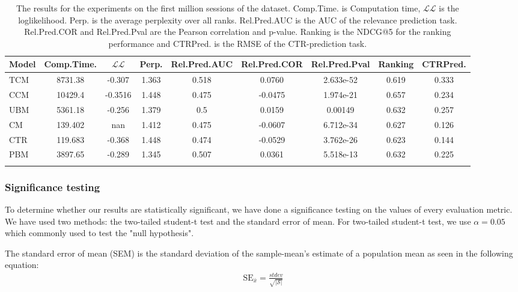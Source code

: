\begin{table}
	\centering
	\begin{tabular}{lcccccccc}
		\toprule
		Model	&	Comp.Time.	&	$\mathcal{LL}$	&	Perp.	&	Rel.Pred.AUC	&	Rel.Pred.COR	&	Rel.Pred.Pval	&	Ranking	&	CTRPred. \\ \midrule
		TCM	&	8731.38	&	-0.307	&	1.363	&	0.518	&	0.0760	&	2.633e-52	&	0.619	&	0.333 \\
		CCM	&	10429.4	&	-0.3516	&	1.448	&	0.475	&	-0.0475	&	1.974e-21	&	0.657	&	0.234 \\
		UBM	&	5361.18	&	-0.256	&	1.379	&	0.5		&	0.0159	&	0.00149		&	0.632	&	0.257 \\
		CM	&	139.402	&	nan		&	1.412	&	0.475	&	-0.0607	&	6.712e-34	&	0.627	&	0.126 \\
		CTR	&	119.683	&	-0.368	&	1.448	&	0.474	&	-0.0529	&	3.762e-26	&	0.623	&	0.144 \\
		PBM	&	3897.65	&	-0.289	&	1.345	&	0.507	&	0.0361	&	5.518e-13	&	0.632	&	0.225 \\ \bottomrule \\
	\end{tabular}
	\caption{The results for the experiments on the first million sessions of the dataset. Comp.Time. is Computation time, $\mathcal{LL}$ is the loglikelihood. Perp. is the average perplexity over all ranks. Rel.Pred.AUC is the AUC of the relevance prediction task. Rel.Pred.COR and Rel.Pred.Pval are the Pearson correlation and p-value. Ranking is the NDCG@5 for the ranking performance and CTRPred. is the RMSE of the CTR-prediction task.}
	\label{table:results}
\end{table}

\subsubsection{Significance testing}
To determine whether our results are statistically significant, we have done a significance testing on the values of every evaluation metric. We have used two methods: the two-tailed student-t test and the standard error of mean. For two-tailed student-t test, we use $\alpha = 0.05$ which commonly used to test the "null hypothesis".

The standard error of mean (SEM) is the standard deviation of the sample-mean's estimate of a population mean as seen in the following equation:
\begin{align*}
	\text{SE}_{\bar{x}} = \frac{stdev}{\sqrt{|\mathcal{S}|}}
\end{align*}

